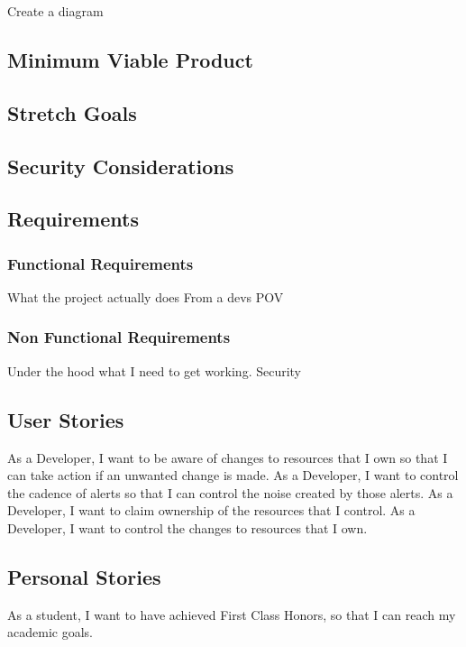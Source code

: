 \documentclass{article}
\begin{document}
Create a diagram


\subsection{Minimum Viable Product} \label{mvp}


\subsection{Stretch Goals} \label{stretch-g}

\subsection{Security Considerations} \label{security}


\subsection{Requirements}



\subsubsection{Functional Requirements}
What the project actually does
From a devs POV



\subsubsection{Non Functional Requirements}
Under the hood what I need to get working. Security




\subsection{User Stories}
As a Developer, I want to be aware of changes to resources that I own so that I can take action if an unwanted change is made.
As a Developer, I want to control the cadence of alerts so that I can control the noise created by those alerts.
As a Developer, I want to claim ownership of the resources that I control.
As a Developer, I want to control the changes to resources that I own.



\subsection{Personal Stories}
As a student, I want to have achieved First Class Honors, so that I can reach my academic goals.
\end{document}
